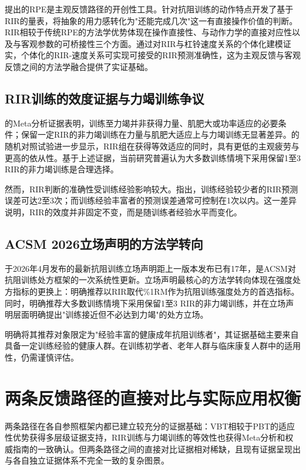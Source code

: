 \citep{Borg1982}提出的RPE是主观反馈路径的开创性工具。\citep{Zourdos2016}针对抗阻训练的动作特点开发了基于RIR的量表，将抽象的用力感转化为"还能完成几次"这一有直接操作价值的判断。RIR相较于传统RPE的方法学优势体现在操作直接性、与动作力学的直接对应性以及与客观参数的可桥接性三个方面。\citep{Jukic2024}通过对RIR与杠铃速度关系的个体化建模证实，个体化的RIR-速度关系可实现可接受的RIR预测准确性，这为主观反馈与客观反馈之间的方法学融合提供了实证基础。

\subsection{RIR训练的效度证据与力竭训练争议}

\citep{Grgic2022}的Meta分析证据表明，训练至力竭并非获得力量、肌肥大或功率适应的必要条件；保留一定RIR的非力竭训练在力量与肌肥大适应上与力竭训练无显著差异。\citep{Refalo2024}的随机对照试验进一步显示，RIR组在获得等效适应的同时，具有更低的主观疲劳与更高的依从性。基于上述证据，当前研究普遍认为大多数训练情境下采用保留1至3 RIR的非力竭训练是合理选择。

然而，RIR判断的准确性受训练经验影响较大。\citep{Hackett2017}指出，训练经验较少者的RIR预测误差可达2至3次；而训练经验丰富者的预测误差通常可控制在1次以内。这一差异说明，RIR的效度并非固定不变，而是随训练者经验水平而变化。

\subsection{ACSM 2026立场声明的方法学转向}

\citep{Currier2026}于2026年4月发布的最新抗阻训练立场声明距上一版本发布已有17年，是ACSM对抗阻训练处方框架的一次系统性更新。立场声明最核心的方法学转向体现在强度处方指标的更换上：明确推荐以RIR取代\%1RM作为抗阻训练强度处方的首选指标。同时，\citep{Currier2026}明确推荐大多数训练情境下采用保留1至3 RIR的非力竭训练，并在立场声明层面明确提出"训练接近但不必达到力竭"的处方立场。

\citep{Currier2026}明确将其推荐对象限定为"经验丰富的健康成年抗阻训练者"，其证据基础主要来自具备一定训练经验的健康人群。在训练初学者、老年人群与临床康复人群中的适用性，仍需谨慎评估。

\section{两条反馈路径的直接对比与实际应用权衡}

两条路径在各自参照框架内都已建立较充分的证据基础：VBT相较于PBT的适应性优势获得多层级证据支持，RIR训练与力竭训练的等效性也获得Meta分析和权威指南的一致确认。但两条路径之间的直接对比证据相对稀缺，且现有证据呈现出与各自独立证据体系不完全一致的复杂图景。

